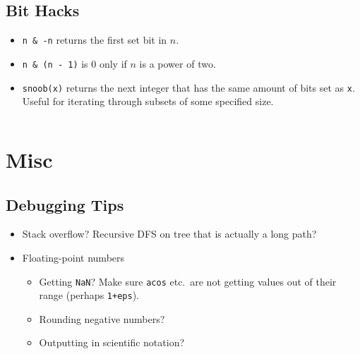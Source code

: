\documentclass[9pt,a4paper,twocolumn,landscape,oneside]{amsart}
\newcommand{\code}[1]{\inputminted{cpp}{_code/#1}}
\begin{document}
    \subsection{Bit Hacks}
        \begin{itemize}
            \item \texttt{n \&{} -n} returns the first set bit in $n$.
            \item \texttt{n \&{} (n - 1)} is $0$ only if $n$ is a power of two.
            \item \texttt{snoob(x)} returns the next integer that has the
                same amount of bits set as \texttt{x}. Useful for iterating
                through subsets of some specified size.
                \code{tricks/snoob.cpp}
        \end{itemize}

    \section{Misc}
        \subsection{Debugging Tips}
            \begin{itemize}
                \item Stack overflow? Recursive DFS on tree that is actually a long path?
                \item Floating-point numbers
                    \begin{itemize}
                        \item Getting \texttt{NaN}? Make sure \texttt{acos} etc.\ are
                            not getting values out of their range (perhaps
                            \texttt{1+eps}).
                        \item Rounding negative numbers?
                        \item Outputting in scientific notation?
                    \end{itemize}
            \end{itemize}
\end{document}

